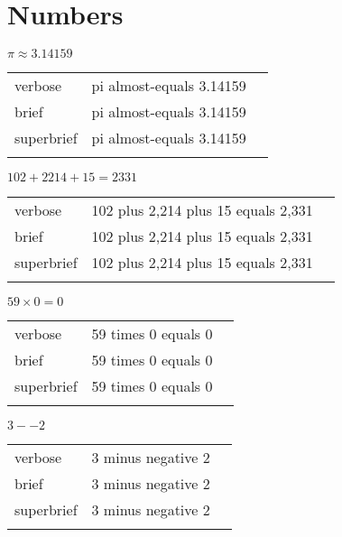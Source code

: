 \section{Numbers}
\label{sec:numbers}

\R
\E $\pi \approx 3.14159$
\begin{longtable}[c]{@{}lll@{}}
\toprule\addlinespace
verbose & pi almost-equals 3.14159 &

\\\addlinespace
brief & pi almost-equals 3.14159 &

\\\addlinespace
superbrief & pi almost-equals 3.14159 &

\\\addlinespace
\bottomrule
\end{longtable}


\E $102 + 2214 + 15 = 2331$
\begin{longtable}[c]{@{}lll@{}}
\toprule\addlinespace
verbose & 102 plus 2,214 plus 15 equals 2,331 &

\\\addlinespace
brief & 102 plus 2,214 plus 15 equals 2,331 &

\\\addlinespace
superbrief & 102 plus 2,214 plus 15 equals 2,331 &

\\\addlinespace
\bottomrule
\end{longtable}


\E $59 \times 0 = 0$
\begin{longtable}[c]{@{}lll@{}}
\toprule\addlinespace
verbose & 59 times 0 equals 0 &

\\\addlinespace
brief & 59 times 0 equals 0 &

\\\addlinespace
superbrief & 59 times 0 equals 0 &

\\\addlinespace
\bottomrule
\end{longtable}


\R
\E $3 - -2$
\begin{longtable}[c]{@{}lll@{}}
\toprule\addlinespace
verbose & 3 minus negative 2 &

\\\addlinespace
brief & 3 minus negative 2 &

\\\addlinespace
superbrief & 3 minus negative 2 &

\\\addlinespace
\bottomrule
\end{longtable}


